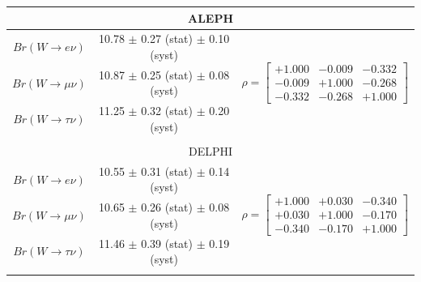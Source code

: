 \begin{table}[ht]
    \setlength{\tabcolsep}{.5 em}
    \renewcommand{\arraystretch}{1.2}
    \centering
    \begin{tabular}{ |c| c  c | } 
         \hline
         \multicolumn{3}{|c|}{ALEPH \cite{Heister:2004wr}} \\
         \hline
         $Br(W\to e    \nu)$    & 10.78 $\pm$ 0.27 (stat) $\pm$ 0.10 (syst) & 
         \multirow{3}{*}{
            \begin{footnotesize}
            $\rho = \begin{bmatrix}
                +1.000 &-0.009 &-0.332 \\ 
                -0.009 &+1.000 &-0.268 \\
                -0.332 &-0.268 &+1.000 
            \end{bmatrix}$ 
            \end{footnotesize} 
         } \\
         $Br(W\to \mu  \nu)$    & 10.87 $\pm$ 0.25 (stat) $\pm$ 0.08 (syst) & \\ 
         $Br(W\to \tau \nu)$    & 11.25 $\pm$ 0.32 (stat) $\pm$ 0.20 (syst) & \\
         \hline
         \multicolumn{3}{c}{} \\
         
         
         \hline
         \multicolumn{3}{|c|}{DELPHI \cite{Abdallah:2003zm}} \\
         \hline
         $Br(W\to e    \nu)$    & 10.55 $\pm$ 0.31 (stat) $\pm$ 0.14 (syst) & 
         \multirow{3}{*}{
            \begin{footnotesize}
            $\rho = \begin{bmatrix}
                +1.000 &+0.030 &-0.340 \\ 
                +0.030 &+1.000 &-0.170 \\
                -0.340 &-0.170 &+1.000 
            \end{bmatrix}$ 
            \end{footnotesize} 
         } \\
         $Br(W\to \mu  \nu)$    & 10.65 $\pm$ 0.26 (stat) $\pm$ 0.08 (syst) & \\ 
         $Br(W\to \tau \nu)$    & 11.46 $\pm$ 0.39 (stat) $\pm$ 0.19 (syst) & \\
         \hline
         \multicolumn{3}{c}{} \\
         

\end{tabular}
\end{table}
